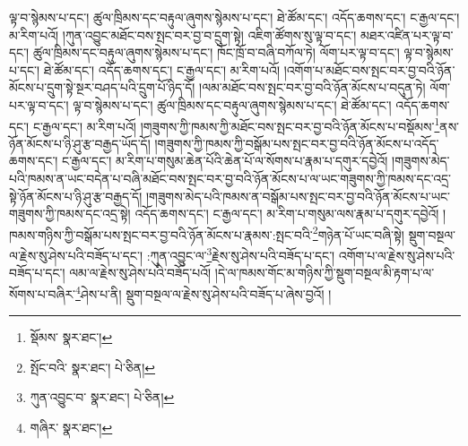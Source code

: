 ལྟ་བ་སྙེམས་པ་དང་། ཚུལ་ཁྲིམས་དང་བརྟུལ་ཞུགས་སྙེམས་པ་དང་། ཐེ་ཚོམ་དང་། འདོད་ཆགས་དང་། ང་རྒྱལ་དང་། མ་རིག་པའོ། །ཀུན་འབྱུང་མཐོང་བས་སྤང་བར་བྱ་བ་དྲུག་སྟེ། འཇིག་ཚོགས་སུ་ལྟ་བ་དང་། མཐར་འཛིན་པར་ལྟ་བ་དང་། ཚུལ་ཁྲིམས་དང་བརྟུལ་ཞུགས་སྙེམས་པ་དང་། ཁོང་ཁྲོ་བ་བཞི་བཀོལ་ཏེ། ལོག་པར་ལྟ་བ་དང་། ལྟ་བ་སྙེམས་པ་དང་། ཐེ་ཚོམ་དང་། འདོད་ཆགས་དང་། ང་རྒྱལ་དང་། མ་རིག་པའོ། །འགོག་པ་མཐོང་བས་སྤང་བར་བྱ་བའི་ཉོན་མོངས་པ་དྲུག་སྟེ་སྔར་བཤད་པའི་དྲུག་པོ་ཉིད་དོ། །ལམ་མཐོང་བས་སྤང་བར་བྱ་བའི་ཉོན་མོངས་པ་བདུན་ཏེ། ལོག་པར་ལྟ་བ་དང་། ལྟ་བ་སྙེམས་པ་དང་། ཚུལ་ཁྲིམས་དང་བརྟུལ་ཞུགས་སྙེམས་པ་དང་། ཐེ་ཚོམ་དང་། འདོད་ཆགས་དང་། ང་རྒྱལ་དང་། མ་རིག་པའོ། །གཟུགས་ཀྱི་ཁམས་ཀྱི་མཐོང་བས་སྤང་བར་བྱ་བའི་ཉོན་མོངས་པ་བསྡོམས་\footnote{སྡོམས་  སྣར་ཐང་། }ནས་ཉོན་མོངས་པ་ཉི་ཤུ་རྩ་བརྒྱད་ཡོད་དོ། །གཟུགས་ཀྱི་ཁམས་ཀྱི་བསྒོམ་པས་སྤང་བར་བྱ་བའི་ཉོན་མོངས་པ་འདོད་ཆགས་དང་། ང་རྒྱལ་དང་། མ་རིག་པ་གསུམ་ཆེན་པོའི་ཆེན་པོ་ལ་སོགས་པ་རྣམ་པ་དགུར་དབྱེའོ། །གཟུགས་མེད་པའི་ཁམས་ན་ཡང་བདེན་པ་བཞི་མཐོང་བས་སྤང་བར་བྱ་བའི་ཉོན་མོངས་པ་ལ་ཡང་གཟུགས་ཀྱི་ཁམས་དང་འདྲ་སྟེ་ཉོན་མོངས་པ་ཉི་ཤུ་རྩ་བརྒྱད་དོ། །གཟུགས་མེད་པའི་ཁམས་ན་བསྒོམ་པས་སྤང་བར་བྱ་བའི་ཉོན་མོངས་པ་ཡང་གཟུགས་ཀྱི་ཁམས་དང་འདྲ་སྟེ། འདོད་ཆགས་དང་། ང་རྒྱལ་དང་། མ་རིག་པ་གསུམ་ལས་རྣམ་པ་དགུར་དབྱེའོ། །ཁམས་གཉིས་ཀྱི་བསྒོམ་པས་སྤང་བར་བྱ་བའི་ཉོན་མོངས་པ་རྣམས་:སྤང་བའི་\footnote{སྤོང་བའི་  སྣར་ཐང་།  པེ་ཅིན། }གཉེན་པོ་ཡང་བཞི་སྟེ། སྡུག་བསྔལ་ལ་རྗེས་སུ་ཤེས་པའི་བཟོད་པ་དང་། :ཀུན་འབྱུང་ལ་\footnote{ཀུན་འབྱུང་བ་  སྣར་ཐང་།  པེ་ཅིན། }རྗེས་སུ་ཤེས་པའི་བཟོད་པ་དང་། འགོག་པ་ལ་རྗེས་སུ་ཤེས་པའི་བཟོད་པ་དང་། ལམ་ལ་རྗེས་སུ་ཤེས་པའི་བཟོད་པའོ། །དེ་ལ་ཁམས་གོང་མ་གཉིས་ཀྱི་སྡུག་བསྔལ་མི་རྟག་པ་ལ་སོགས་པ་བཞིར་\footnote{གཞིར་  སྣར་ཐང་། }ཤེས་པ་ནི། སྡུག་བསྔལ་ལ་རྗེས་སུ་ཤེས་པའི་བཟོད་པ་ཞེས་བྱའོ། །
